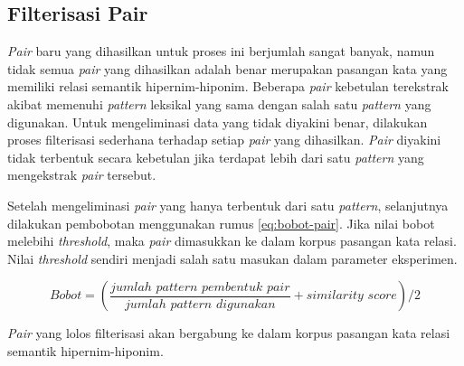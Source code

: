 \subsection{Filterisasi Pair}
\textit{Pair} baru yang dihasilkan untuk proses ini berjumlah sangat banyak, namun tidak semua \textit{pair} yang dihasilkan adalah benar merupakan pasangan kata yang memiliki relasi semantik hipernim-hiponim. Beberapa \textit{pair} kebetulan terekstrak akibat memenuhi \textit{pattern} leksikal yang sama dengan salah satu \textit{pattern} yang digunakan. Untuk mengeliminasi data yang tidak diyakini benar, dilakukan proses filterisasi sederhana terhadap setiap \textit{pair} yang dihasilkan. \textit{Pair} diyakini tidak terbentuk secara kebetulan jika terdapat lebih dari satu \textit{pattern} yang mengekstrak \textit{pair} tersebut. 

Setelah mengeliminasi \textit{pair} yang hanya terbentuk dari satu \textit{pattern}, selanjutnya dilakukan pembobotan menggunakan rumus \ref{eq:bobot-pair}. Jika nilai bobot melebihi \textit{threshold}, maka \textit{pair} dimasukkan ke dalam korpus pasangan kata relasi. Nilai \textit{threshold} sendiri menjadi salah satu masukan dalam parameter eksperimen.

\begin{equation}
\label{eq:bobot-pair}
Bobot = (\frac{jumlah\,\,pattern\,\,pembentuk\,\,pair}{jumlah\,\,pattern\,\,digunakan} + similarity\,\,score)/2
\end{equation}

\noindent \textit{Pair} yang lolos filterisasi akan bergabung ke dalam korpus pasangan kata relasi semantik hipernim-hiponim.


